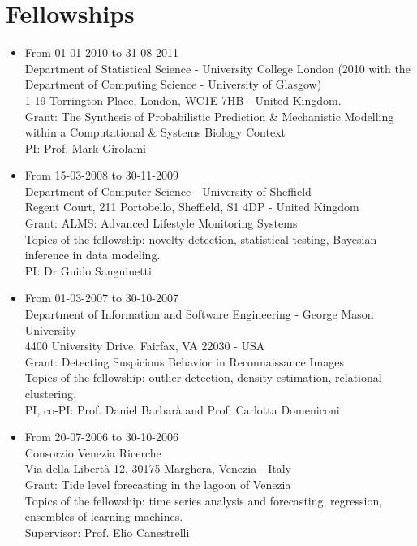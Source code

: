 \documentclass[a4paper,10pt]{article}
\begin{document}
\section*{Fellowships}
\begin{itemize}
\item From 01-01-2010 to 31-08-2011 \\
  Department of Statistical Science - University College London (2010 with the Department of Computing Science - University of Glasgow) \\
  1-19 Torrington Place, London, WC1E 7HB - United Kingdom. \\
  Grant: The Synthesis of Probabilistic Prediction \& Mechanistic Modelling within a Computational \& Systems Biology Context \\
  PI: Prof. Mark Girolami

\item From 15-03-2008 to 30-11-2009 \\
  Department of Computer Science - University of Sheffield \\
  Regent Court, 211 Portobello, Sheffield, S1 4DP - United Kingdom \\
  Grant: ALMS: Advanced Lifestyle Monitoring Systems \\
  Topics of the fellowship: novelty detection, statistical testing, Bayesian inference in data modeling. \\
  PI: Dr Guido Sanguinetti

\item From 01-03-2007 to 30-10-2007 \\
  Department of Information and Software Engineering - George Mason University \\
  4400 University Drive, Fairfax, VA 22030 - USA \\
  Grant: Detecting Suspicious Behavior in Reconnaissance Images \\
  Topics of the fellowship: outlier detection, density estimation, relational clustering. \\
  PI, co-PI: Prof. Daniel Barbar\`a and Prof. Carlotta Domeniconi

\item From 20-07-2006 to 30-10-2006 \\
  Consorzio Venezia Ricerche \\
  Via della Libert\`a 12, 30175 Marghera, Venezia - Italy \\
  Grant: Tide level forecasting in the lagoon of Venezia \\ 
  Topics of the fellowship: time series analysis and forecasting, regression, ensembles of learning machines. \\
  Supervisor: Prof. Elio Canestrelli


\end{itemize}
\end{document}
